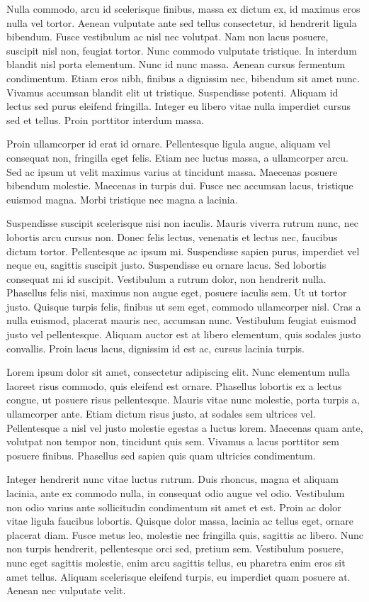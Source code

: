 \documentclass[twoside,openright,a4paper,11pt,french]{article}
\begin{document}
Nulla commodo, arcu id scelerisque finibus, massa ex dictum ex, id maximus eros nulla vel tortor. Aenean vulputate ante sed tellus consectetur, id hendrerit ligula bibendum. Fusce vestibulum ac nisl nec volutpat. Nam non lacus posuere, suscipit nisl non, feugiat tortor. Nunc commodo vulputate tristique. In interdum blandit nisl porta elementum. Nunc id nunc massa. Aenean cursus fermentum condimentum. Etiam eros nibh, finibus a dignissim nec, bibendum sit amet nunc. Vivamus accumsan blandit elit ut tristique. Suspendisse potenti. Aliquam id lectus sed purus eleifend fringilla. Integer eu libero vitae nulla imperdiet cursus sed et tellus. Proin porttitor interdum massa.

Proin ullamcorper id erat id ornare. Pellentesque ligula augue, aliquam vel consequat non, fringilla eget felis. Etiam nec luctus massa, a ullamcorper arcu. Sed ac ipsum ut velit maximus varius at tincidunt massa. Maecenas posuere bibendum molestie. Maecenas in turpis dui. Fusce nec accumsan lacus, tristique euismod magna. Morbi tristique nec magna a lacinia.

Suspendisse suscipit scelerisque nisi non iaculis. Mauris viverra rutrum nunc, nec lobortis arcu cursus non. Donec felis lectus, venenatis et lectus nec, faucibus dictum tortor. Pellentesque ac ipsum mi. Suspendisse sapien purus, imperdiet vel neque eu, sagittis suscipit justo. Suspendisse eu ornare lacus. Sed lobortis consequat mi id suscipit. Vestibulum a rutrum dolor, non hendrerit nulla. Phasellus felis nisi, maximus non augue eget, posuere iaculis sem. Ut ut tortor justo. Quisque turpis felis, finibus ut sem eget, commodo ullamcorper nisl. Cras a nulla euismod, placerat mauris nec, accumsan nunc. Vestibulum feugiat euismod justo vel pellentesque. Aliquam auctor est at libero elementum, quis sodales justo convallis. Proin lacus lacus, dignissim id est ac, cursus lacinia turpis.

Lorem ipsum dolor sit amet, consectetur adipiscing elit. Nunc elementum nulla laoreet risus commodo, quis eleifend est ornare. Phasellus lobortis ex a lectus congue, ut posuere risus pellentesque. Mauris vitae nunc molestie, porta turpis a, ullamcorper ante. Etiam dictum risus justo, at sodales sem ultrices vel. Pellentesque a nisl vel justo molestie egestas a luctus lorem. Maecenas quam ante, volutpat non tempor non, tincidunt quis sem. Vivamus a lacus porttitor sem posuere finibus. Phasellus sed sapien quis quam ultricies condimentum.

Integer hendrerit nunc vitae luctus rutrum. Duis rhoncus, magna et aliquam lacinia, ante ex commodo nulla, in consequat odio augue vel odio. Vestibulum non odio varius ante sollicitudin condimentum sit amet et est. Proin ac dolor vitae ligula faucibus lobortis. Quisque dolor massa, lacinia ac tellus eget, ornare placerat diam. Fusce metus leo, molestie nec fringilla quis, sagittis ac libero. Nunc non turpis hendrerit, pellentesque orci sed, pretium sem. Vestibulum posuere, nunc eget sagittis molestie, enim arcu sagittis tellus, eu pharetra enim eros sit amet tellus. Aliquam scelerisque eleifend turpis, eu imperdiet quam posuere at. Aenean nec vulputate velit.
\end{document}
